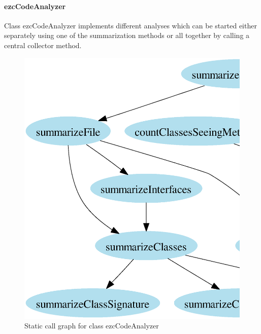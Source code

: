 \documentclass[10pt,final,a4paper,oneside]{article}
\begin{document}


\paragraph{ezcCodeAnalyzer}
Class ezcCodeAnalyzer
implements different analyses which can be started either
separately using one of the summarization methods
or all together by calling a central collector method.

\begin{figure}[htbp]
	\centering
		\includegraphics[width=1.00\textwidth]{figures/callgraph-code_analyzer.ps}
	\caption{Static call graph for class ezcCodeAnalyzer}
	\label{fig:callgraph-code_analyzer}
\end{figure}
\end{document}
